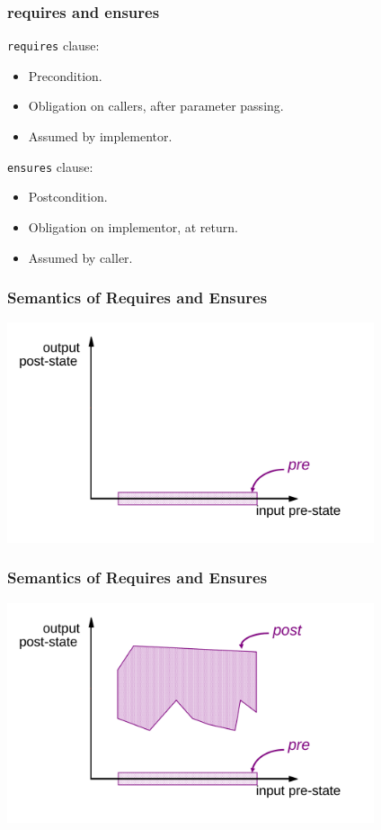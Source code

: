 \begin{frame}[fragile]
\frametitle{requires and ensures}

\lstinline!requires! clause:
\begin{itemize}
\item
Precondition.

\item
Obligation on callers, after parameter passing.

\item
Assumed by implementor.
\end{itemize}

\lstinline!ensures! clause:
\begin{itemize}
\item
Postcondition.

\item
Obligation on implementor, at return.

\item
Assumed by caller.
\end{itemize}
\end{frame}

\begin{frame}
\frametitle{Semantics of Requires and Ensures}
\includegraphics[width=4.25in]{requires}
\end{frame}

\begin{frame}
\frametitle{Semantics of Requires and Ensures}
\includegraphics[width=4.25in]{ensures}
\end{frame}

